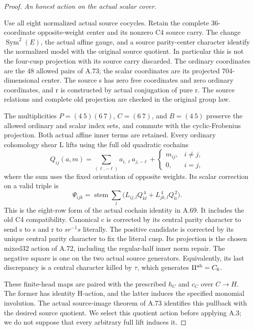 \begin{proof}
\emph{An honest action on the actual scalar cover.}\par
Use all eight normalized actual source cocycles. Retain the complete
36-coordinate opposite-weight center and its nonzero C4 source carry.
The change \(\operatorname{Sym}^2(E)\), the actual affine gauge,
and a source parity-center character identify the normalized model
with the original source quotient. In particular this is not the
four-cusp projection with its source carry discarded. The ordinary
coordinates are the 48 allowed pairs of A.73; the scalar coordinates
are its projected 704-dimensional center. The source s has zero free
coordinates and zero ordinary coordinates, and r is constructed by
actual conjugation of pure r. The source relations and complete old
projection are checked in the original group law.

The multiplicities \(P=(4\ 5)(6\ 7)\), \(C=(6\ 7)\), and
\(B=(4\ 5)\) preserve the allowed ordinary and scalar index sets,
and commute with the cyclic-Frobenius projection. Both actual affine
inner terms are retained. Every ordinary cohomology shear L lifts
using the full old quadratic cochains
\[
 Q_{ij}(a,m)=\sum_{(\ell,-\ell)}a_{i,\ell}a_{j,-\ell}
             +\begin{cases}m_{ij},&i\ne j,\\0,&i=j,\end{cases}
\]
where the sum uses the fixed orientation of opposite weights. Its
scalar correction on a valid triple is
\[
 \Psi_{ijk}=
 \operatorname{stem}\sum_l
       \bigl(L_{ij,l}Q_{kl}^{\,4}+L_{jk,l}^{\,4}Q_{li}^{\,2}\bigr).
 \tag{A.75.1}
\]
This is the eight-row form of the actual cochain identity in A.69.
It includes the old C4 compatibility. Canonical c is corrected by
its central parity character to send s to s and r to
\(sr^{-1}s\) literally. The positive candidate is corrected by
its unique central parity character to fix the literal cusp. Its
projection is the chosen mixed32 action of A.72, including the
regular-half inner norm repair. The negative square is one on the
two actual source generators. Equivalently, its last discrepancy
is a central character killed by \(\tau\), which generates
\(\Pi^{\rm ab}=C_6\).

These finite-head maps are paired with the prescribed \(h_C\)
and \(c_C\) over \(C\to H\). The former has identity H-action,
and the latter induces the specified monomial involution. The actual
source-image theorem of A.73 identifies this pullback with the desired
source quotient. We select this quotient action before applying A.3;
we do not suppose that every arbitrary full lift induces it.


\end{proof}
